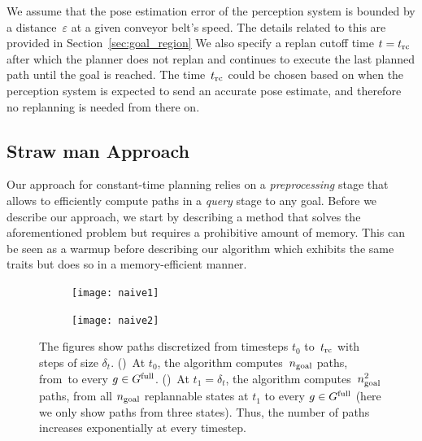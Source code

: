 \documentclass[a4paper]{report}
\begin{document}
{%
}
We assume that the pose estimation error of the perception system is bounded by a distance~$\varepsilon$ at a given conveyor belt's speed. The details related to this are provided in Section~\ref{sec:goal_region}
We also specify a replan cutoff time $t=t_{\textrm{rc}}$ after which the planner does not replan and continues to execute the last planned path until the goal is reached. The time~$t_{\textrm{rc}}$ could be chosen based on when the perception system is expected to send an accurate pose estimate, and therefore no replanning is needed from there on.


\subsection{Straw man Approach}
\label{subsec:strawman}
Our approach for constant-time planning relies on a \emph{preprocessing} stage that allows to efficiently compute paths in a \emph{query} stage to any goal.
%
Before we describe our approach, we start by describing a \naive method that solves the aforementioned problem but requires a prohibitive amount of memory.
%
This can be seen as a warmup before describing our algorithm which exhibits the same traits but does so in a memory-efficient manner.

\begin{figure}[t]
    \centering
    \begin{subfigure}{.49\textwidth}
         \texttt{[image: naive1]}
        \caption{}
        \label{fig:naive1}
    \end{subfigure}
    \begin{subfigure}{0.49\textwidth}
         \texttt{[image: naive2]}
        \caption{}
        \label{fig:naive2}
    \end{subfigure}
    \caption{
    \CaptionTextSize
    The figures show paths discretized from timesteps $t_0$ to~$t_{\textrm{rc}}$ with steps of size $\delta_t$.
    ()~At $t_0$, the algorithm computes~$n_{\rm goal}$ paths, from~\Shome to every $g \in G^{\textrm{full}}$.
    ()~At $t_1 = \delta_t$, the algorithm computes~$n_{\rm goal}^2$ paths, from all $n_{\rm goal}$ replannable states at $t_1$ to every $g \in G^{\textrm{full}}$ (here we only show paths from three states).
    Thus, the number of paths increases exponentially at every timestep.
    }
    \label{fig:naive}
\end{figure}
\end{document}
